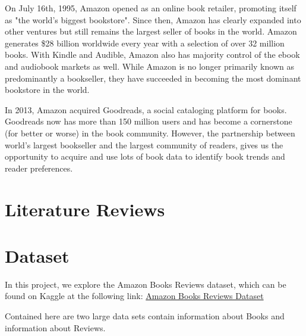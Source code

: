\documentclass[12pt]{article}
\numberwithin{equation}{section}
\begin{document}
On July 16th, 1995, Amazon opened as an online book retailer, promoting itself as "the world's biggest bookstore". Since then, Amazon has clearly expanded into other ventures but still remains the largest seller of books in the world. Amazon generates \$28 billion worldwide every year with a selection of over 32 million books. With Kindle and Audible, Amazon also has majority control of the ebook and audiobook markets as well. While Amazon is no longer primarily known as predominantly a bookseller, they have succeeded in becoming the most dominant bookstore in the world.

In 2013, Amazon acquired Goodreads, a social cataloging platform for books. Goodreads now has more than 150 million users and has become a cornerstone (for better or worse) in the book community. However, the partnership between world's largest bookseller and the largest community of readers, gives us the opportunity to acquire and use lots of book data to identify book trends and reader preferences.

\section{Literature Reviews}

\section{Dataset}

In this project, we explore the Amazon Books Reviews dataset, which can be found on Kaggle at the following link: \href{https://www.kaggle.com/datasets/mohamedbakhet/amazon-books-reviews}{Amazon Books Reviews Dataset}

Contained here are two large data sets contain information about Books and information about Reviews.
\end{document}
